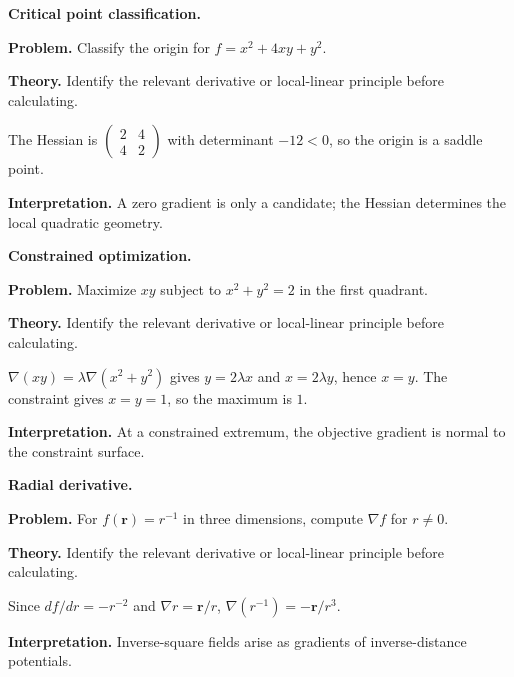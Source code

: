\begin{workedexample}
\textbf{Critical point classification.}\par
\textbf{Problem.} Classify the origin for $f=x^2+4xy+y^2$.

\textbf{Theory.} Identify the relevant derivative or local-linear principle before calculating.

\begin{solution}
The Hessian is $\begin{pmatrix}2&4\\4&2\end{pmatrix}$ with determinant $-12<0$, so the origin is a saddle point.

\textbf{Interpretation.} A zero gradient is only a candidate; the Hessian determines the local quadratic geometry.
\end{solution}
\end{workedexample}

\begin{workedexample}
\textbf{Constrained optimization.}\par
\textbf{Problem.} Maximize $xy$ subject to $x^2+y^2=2$ in the first quadrant.

\textbf{Theory.} Identify the relevant derivative or local-linear principle before calculating.

\begin{solution}
$\nabla(xy)=\lambda\nabla(x^2+y^2)$ gives $y=2\lambda x$ and $x=2\lambda y$, hence $x=y$. The constraint gives $x=y=1$, so the maximum is $1$.

\textbf{Interpretation.} At a constrained extremum, the objective gradient is normal to the constraint surface.
\end{solution}
\end{workedexample}

\begin{workedexample}
\textbf{Radial derivative.}\par
\textbf{Problem.} For $f(\mathbf r)=r^{-1}$ in three dimensions, compute $\nabla f$ for $r\ne0$.

\textbf{Theory.} Identify the relevant derivative or local-linear principle before calculating.

\begin{solution}
Since $df/dr=-r^{-2}$ and $\nabla r=\mathbf r/r$, $\nabla(r^{-1})=-\mathbf r/r^3$.

\textbf{Interpretation.} Inverse-square fields arise as gradients of inverse-distance potentials.
\end{solution}
\end{workedexample}

